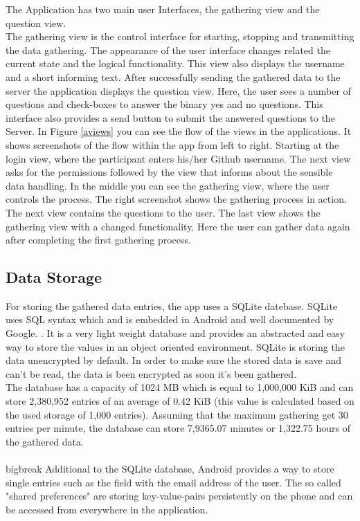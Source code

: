 The Application has two main user Interfaces, the gathering view and the question view.\\
The gathering view is the control interface for starting, stopping and transmitting the data gathering. The appearance of the user interface changes related the current state and the logical functionality. 
This view also displays the username and a short informing text.
\bigbreak
After successfully sending the gathered data to the server the application displays the question view. Here, the user sees a number of questions and check-boxes to answer the binary yes and no questions. 
This interface also provides a send button to submit the answered questions to the Server.
\bigbreak
In Figure \ref{aviews} you can see the flow of the views in the applications.
It shows screenshots of the flow within the app from left to right. Starting at the login view, where the participant enters his/her Github username. 
The next view asks for the permissions followed by the view that informs about the sensible data handling. 
In the middle you can see the gathering view, where the user controls the process. The right screenshot shows the gathering process in action. The next view contains the questions to the user. The last view shows the gathering view with a changed functionality. Here the user can gather data again after completing the first gathering process. 

\subsection{Data Storage}
For storing the gathered data entries, the app uses a SQLite datebase. SQLite uses SQL syntax which and is embedded in Android and well documented by Google. \cite{vogel2010android}. It is a very light weight database and provides an abstracted and easy way to store the values in an object oriented environment. SQLite is storing the data unencrypted by default. In order to make sure the stored data is save and can't be read, the data is been encrypted as soon it's been gathered.\\
The database has a capacity of 1024 MB which is equal to 1,000,000 KiB and can store 2,380,952 entries of an average of 0.42 KiB (this value is calculated based on the used storage of 1,000 entries). Assuming that the maximum gathering get 30 entries per minute, the database can store 7,9365.07 minutes or 1,322.75 hours of the gathered data.\\
\\bigbreak
Additional to the SQLite database, Android provides a way to store single entries such as the field with the email address of the user. The so called "shared preferences" are storing key-value-pairs persistently on the phone and can be accessed from everywhere in the application.


